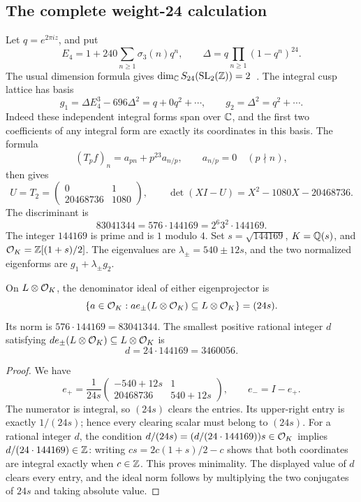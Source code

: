 \subsection{The complete weight-24 calculation}

Let $q=e^{2\pi i z}$, and put
\[
 E_4=1+240\sum_{n\ge1}\sigma_3(n)q^n,
 \qquad \Delta=q\prod_{n\ge1}(1-q^n)^{24}.
\]
The usual dimension formula gives
$\dim_\mathbb C S_{24}(\operatorname{SL}_2(\mathbb Z))=2$~\cite{hida}.
The integral cusp lattice has basis
\[
 g_1=\Delta E_4^3-696\Delta^2=q+0q^2+\cdots,
 \qquad g_2=\Delta^2=q^2+\cdots.
\]
Indeed these independent integral forms span over $\mathbb C$, and the first two
coefficients of any integral form are exactly its coordinates in this
basis. The formula
\[
 (T_p f)_n=a_{pn}+p^{23}a_{n/p},
 \qquad a_{n/p}=0\quad(p\nmid n),
\]
then gives
\begin{equation}\label{eq:t2}
 U=T_2=\begin{pmatrix}0&1\\20468736&1080\end{pmatrix},
 \qquad \det(XI-U)=X^2-1080X-20468736.
\end{equation}
The discriminant is
\[
 83041344=576\cdot144169=2^6 3^2\cdot144169.
\]
The integer $144169$ is prime and is $1$ modulo $4$. Set
$s=\sqrt{144169}$, $K=\mathbb Q(s)$, and
$\mathcal O_K=\mathbb Z[(1+s)/2]$. The eigenvalues are
$\lambda_\pm=540\pm12s$, and the two normalized eigenforms are
$g_1+\lambda_\pm g_2$.

\begin{proposition}
On $L\otimes\mathcal O_K$, the denominator ideal of either eigenprojector is
\[
 \{a\in\mathcal O_K:a e_\pm(L\otimes\mathcal O_K)\subseteq L\otimes\mathcal O_K\}
       =(24s).
\]
Its norm is $576\cdot144169=83041344$. The smallest positive rational
integer $d$ satisfying $d e_\pm(L\otimes\mathcal O_K)\subseteq L\otimes\mathcal O_K$
is
\[
 d=24\cdot144169=3460056.
\]
\end{proposition}
\begin{proof}
We have
\[
 e_+=\frac1{24s}
 \begin{pmatrix}-540+12s&1\\20468736&540+12s\end{pmatrix},
 \qquad e_-=I-e_+.
\]
The numerator is integral, so $(24s)$ clears the entries. Its upper-right
entry is exactly $1/(24s)$; hence every clearing scalar must belong to
$(24s)$. For a rational integer $d$, the condition
$d/(24s)=(d/(24\cdot144169))s\in\mathcal O_K$ implies
$d/(24\cdot144169)\in\mathbb Z$: writing $cs=2c(1+s)/2-c$ shows that both
coordinates are integral exactly when $c\in\mathbb Z$. This proves minimality.
The displayed value of $d$ clears every entry, and the ideal norm follows
by multiplying the two conjugates of $24s$ and taking absolute value.
\end{proof}

